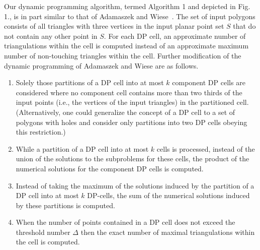 \documentclass[a4paper]{article}
\begin{document}
Our  dynamic programming algorithm, termed Algorithm 1
and depicted in Fig. 1.,
is in part similar to that of Adamaszek and Wiese~\cite{AW14}.
The set of input polygons consists
of all triangles with three vertices
in the input planar point set $S$
that do not contain any other
point in $S$. 
For each DP cell, an approximate
number of triangulations
within the cell is computed
instead of an approximate
maximum number of non-touching triangles
within the cell.
Further modification
of the dynamic programming
of Adamaszek and Wiese are as follows.
\begin{enumerate}
\item
Solely those partitions of a DP cell
into at most $k$ component DP cells
are considered where no component cell contains
more than two thirds of the
input points 
(i.e., the vertices
of the input triangles) 
in the partitioned cell.
(Alternatively, one could
generalize the concept of a DP cell
to a set of polygons with holes
and consider only partitions into two
DP cells obeying this restriction.)
\item
While a partition of a DP cell
into at most $k$ cells is 
processed, instead of the
union of the solutions
to the subproblems for
these cells, the product
of the numerical solutions
for the component DP cells
is computed. 
\item
Instead of taking the maximum
of the solutions induced
by the partition of a DP cell into at
most $k$ DP-cells, 
the sum of the numerical solutions 
induced by these partitions is computed.
\item
When the number of points
contained in a DP cell 
does not exceed the threshold number
$\Delta$ then 
the exact number of maximal triangulations
within the cell is computed.
\end{enumerate}
\end{document}
